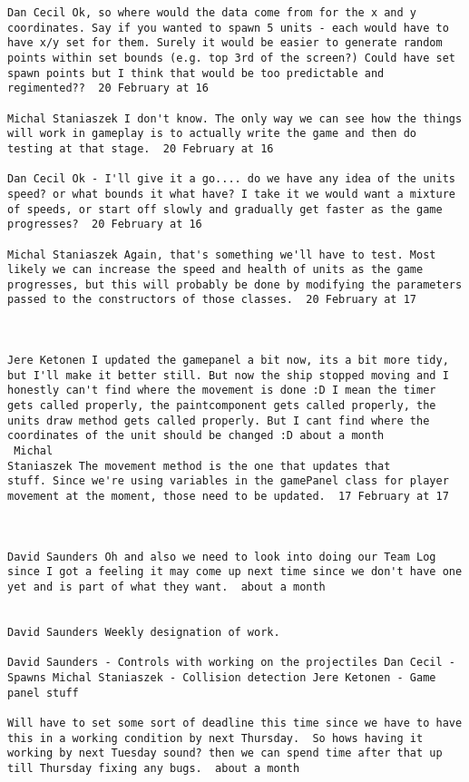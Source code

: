 \begin{verbatim}
Dan Cecil Ok, so where would the data come from for the x and y
coordinates. Say if you wanted to spawn 5 units - each would have to
have x/y set for them. Surely it would be easier to generate random
points within set bounds (e.g. top 3rd of the screen?) Could have set
spawn points but I think that would be too predictable and
regimented??  20 February at 16

Michal Staniaszek I don't know. The only way we can see how the things
will work in gameplay is to actually write the game and then do
testing at that stage.  20 February at 16

Dan Cecil Ok - I'll give it a go.... do we have any idea of the units
speed? or what bounds it what have? I take it we would want a mixture
of speeds, or start off slowly and gradually get faster as the game
progresses?  20 February at 16

Michal Staniaszek Again, that's something we'll have to test. Most
likely we can increase the speed and health of units as the game
progresses, but this will probably be done by modifying the parameters
passed to the constructors of those classes.  20 February at 17



Jere Ketonen I updated the gamepanel a bit now, its a bit more tidy,
but I'll make it better still. But now the ship stopped moving and I
honestly can't find where the movement is done :D I mean the timer
gets called properly, the paintcomponent gets called properly, the
units draw method gets called properly. But I cant find where the
coordinates of the unit should be changed :D about a month 
 Michal
Staniaszek The movement method is the one that updates that
stuff. Since we're using variables in the gamePanel class for player
movement at the moment, those need to be updated.  17 February at 17



David Saunders Oh and also we need to look into doing our Team Log
since I got a feeling it may come up next time since we don't have one
yet and is part of what they want.  about a month 


David Saunders Weekly designation of work.

David Saunders - Controls with working on the projectiles Dan Cecil -
Spawns Michal Staniaszek - Collision detection Jere Ketonen - Game
panel stuff

Will have to set some sort of deadline this time since we have to have
this in a working condition by next Thursday.  So hows having it
working by next Tuesday sound? then we can spend time after that up
till Thursday fixing any bugs.  about a month 



\end{verbatim}
